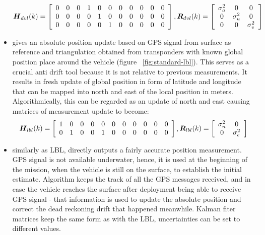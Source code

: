 \begin{itemize}
\begin{equation}
\label{eq:dvl-mes}
\boldsymbol{H}_{dvl}(k) = 
\left[ \begin{array}{ccccccccccc}
0 & 0 & 0 & 1 & 0 & 0 & 0 & 0 & 0 & 0 & 0 \\
0 & 0 & 0 & 0 & 1 & 0 & 0 & 0 & 0 & 0 & 0 \\
0 & 0 & 0 & 0 & 0 & 1 & 0 & 0 & 0 & 0 & 0 \end{array} \right], 
\boldsymbol{R}_{dvl}(k) =
\left[ \begin{array}{ccc}
\sigma_{a}^{2} & 0 & 0 \\
0 & \sigma_{u}^{2} & 0 \\
0 &     0          & \sigma_{v}^{2} \end{array} \right]
\end{equation}
\item {}
gives an absolute position update based on GPS signal from surface as reference and triangulation obtained from transponders with known global position place around the vehicle (figure ~\ref{fig:standard-lbl}). This serves as a crucial anti drift tool because it is not relative to previous measurements. It results in fresh update of global position in form of latitude and longitude that can be mapped into north and east of the local position in meters. Algorithmically, this can be regarded as an update of north and east causing matrices of measurement update to become:
\begin{equation}
\label{eq:lbl-mes}
\boldsymbol{H}_{lbl}(k) = 
\left[ \begin{array}{ccccccccccc}
1 & 0 & 0 & 0 & 0 & 0 & 0 & 0 & 0 & 0 & 0 \\
0 & 1 & 0 & 0 & 1 & 0 & 0 & 0 & 0 & 0 & 0 \end{array} \right], 
\boldsymbol{R}_{lbl}(k) =
\left[ \begin{array}{cc}
\sigma_{n}^{2} & 0  \\
0 & \sigma_{e}^{2}  \end{array} \right]
\end{equation}
\item {}
similarly as LBL, directly outputs a fairly accurate position measurement. GPS signal is not available underwater, hence, it is used at the beginning of the mission, when the vehicle is still on the surface, to establish the initial estimate. Algorithm keeps the track of all the GPS messages received, and in case the vehicle reaches the surface after deployment being able to receive GPS signal - that information is used to update the absolute position and correct the dead reckoning drift that happened meanwhile. Kalman fiter matrices keep the same form as with the LBL, uncertainties can be set to different values.
\end{itemize}

